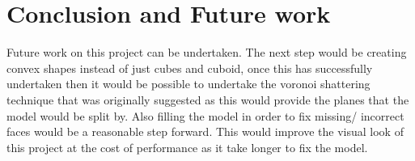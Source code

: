\documentclass[conference,backref=page]{acmsiggraph}
\begin{document}
\section{Conclusion and Future work}

Future work on this project can be undertaken. The next step would be creating convex shapes instead of just cubes and cuboid, once this has successfully undertaken then it would be possible to undertake the voronoi shattering technique that was originally suggested as this would provide the planes that the model would be split by. Also filling the model in order to fix missing/ incorrect faces would be a reasonable step forward. This would improve the visual look of this project at the cost of performance as it take longer to fix the model.






\end{document}
